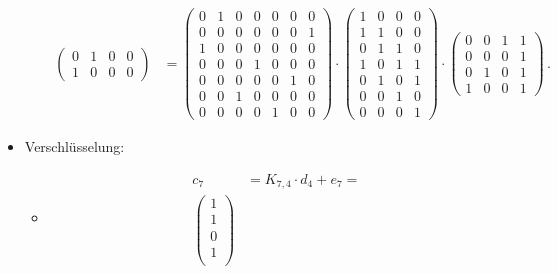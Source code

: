 \begin{itemize}
\begin{itemize}
\begin{align*}
\begin{pmatrix}
                0 & 1 & 0 & 0\\
                1 & 0 & 0 & 0
            \end{pmatrix}
            &=
            \begin{pmatrix} %
                0 & 1 & 0 & 0 & 0 & 0 & 0\\
                0 & 0 & 0 & 0 & 0 & 0 & 1\\
                1 & 0 & 0 & 0 & 0 & 0 & 0\\
                0 & 0 & 0 & 1 & 0 & 0 & 0\\
                0 & 0 & 0 & 0 & 0 & 1 & 0\\
                0 & 0 & 1 & 0 & 0 & 0 & 0\\
                0 & 0 & 0 & 0 & 1 & 0 & 0
            \end{pmatrix}
            \cdot
            \begin{pmatrix} %
                1 & 0 & 0 & 0\\
                1 & 1 & 0 & 0\\
                0 & 1 & 1 & 0\\
                1 & 0 & 1 & 1\\
                0 & 1 & 0 & 1\\
                0 & 0 & 1 & 0\\
                0 & 0 & 0 & 1
            \end{pmatrix}
            \cdot
            \begin{pmatrix} %
                0 & 0 & 1 & 1\\
                0 & 0 & 0 & 1\\
                0 & 1 & 0 & 1\\
                1 & 0 & 0 & 1
            \end{pmatrix}
            \,.
        \end{align*}
    \end{itemize}
    \item Verschlüsselung:
    \begin{itemize}
        \item[]
        \begin{align*}
            c_7&=K_{7,4}\cdot d_4 + e_7=\\
        \begin{pmatrix} %
            1\\
            1\\
            0\\
            1\\

\end{pmatrix}
\end{align*}
\end{itemize}
\end{itemize}
